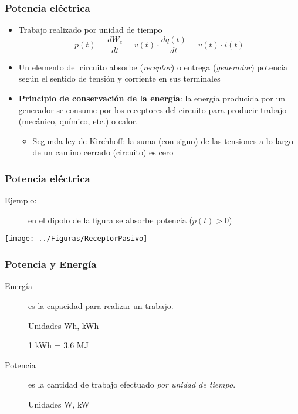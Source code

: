 \documentclass[serif, xcolor=dvipsnames]{beamer}
\begin{document}
\begin{frame}
  \frametitle{Potencia eléctrica}
  \begin{itemize}
  \item Trabajo realizado por unidad de tiempo
    \[
    p(t)=\frac{dW_{e}}{dt}=v(t)\cdot\frac{dq(t)}{dt}=v(t)\cdot i(t)
    \]

  \item Un elemento del circuito absorbe (\emph{receptor}) o entrega
    (\emph{generador}) potencia según el sentido de tensión y
    corriente en sus terminales
  \item \textbf{Principio de conservación de la energía}: la energía
    producida por un generador se consume por los receptores del
    circuito para producir trabajo (mecánico, químico, etc.) o calor.

    \begin{itemize}
    \item Segunda ley de Kirchhoff: la suma (con signo) de las
      tensiones a lo largo de un camino cerrado (circuito) es cero
    \end{itemize}
  \end{itemize}

\end{frame}
\begin{frame}
  \frametitle{Potencia eléctrica}
  \begin{description}
  \item [{Ejemplo:}] en el dipolo de la figura se absorbe potencia
    ($p(t)>0$)
  \end{description}
  \begin{center}
    \texttt{[image: ../Figuras/ReceptorPasivo]}
    \par\end{center}


\end{frame}
\begin{frame}
  \frametitle{Potencia y Energía}
  \begin{description}
  \item [{Energía}] es la capacidad para realizar un trabajo.


    Unidades Wh, kWh


    1 kWh = 3.6 MJ

  \item [{Potencia}] es la cantidad de trabajo efectuado \emph{por
      unidad de tiempo}.


    Unidades W, kW

  \end{description}

\end{frame}
\end{document}
